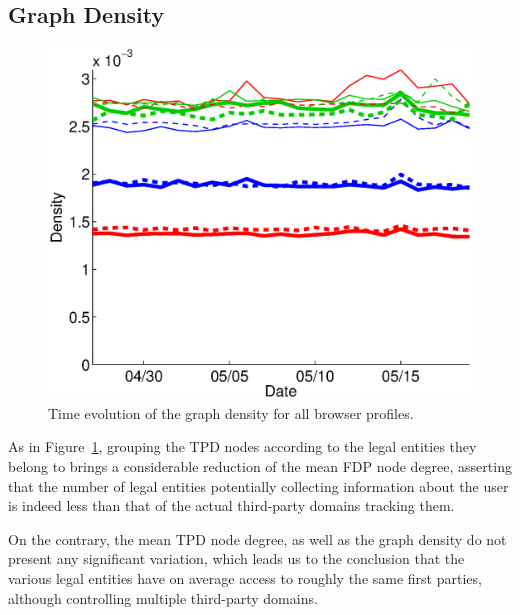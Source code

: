 \documentclass[compsoc, conference, letterpaper, 10pt, times]{IEEEtran}
\begin{document}
\subsection{Graph Density}

  \begin{figure}
   \centering
  \includegraphics[width=.45\textwidth]{figures/plots/density.eps}

  \caption{Time evolution of the graph density for all browser profiles.}
  \label{fig:metrics_graphdensity}
  \end{figure}


As in Figure~\ref{fig:metrics_graphdensity}, grouping the TPD nodes according to the legal entities they belong to brings a considerable reduction of the mean FDP node degree, asserting that the number of legal entities potentially collecting information about the user is indeed less than that of the actual third-party domains tracking them.

On the contrary, the mean TPD node degree, as well as the graph density do not present any significant variation, which leads us to the conclusion that the various legal entities have on average access to roughly the same first parties, although controlling multiple third-party domains.





\end{document}
